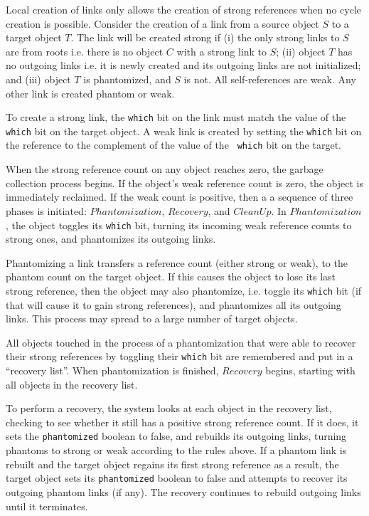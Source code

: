 Local creation of links only allows the creation of strong references when no
cycle creation is possible. Consider the creation of a link from a source object $S$
to a target object $T$. The link will be created strong if (i) the only strong
links to $S$ are from roots i.e. there is no object $C$ with a strong link to $S$;
(ii) object $T$ has no outgoing links i.e. it is newly created and its outgoing links are
not initialized; and (iii) object $T$ is phantomized, and $S$ is not. All
self-references are weak. Any other link is created phantom or weak.

To create a strong link, the {\tt which} bit on the link must match the value of
the {\tt which} bit on the target object. A weak link is created by setting the
{\tt which} bit on the reference to the complement of the value of the {\tt
which} bit on the target.

When the strong reference count on any object reaches zero, the garbage
collection process begins.
If the object's weak reference count is zero, the
object is immediately reclaimed. If the weak count is positive, then a
a sequence of three phases is initiated: $Phantomization$, $Recovery$, and $CleanUp$.
In $Phantomization$, the object toggles its {\tt which} bit, turning its
incoming weak reference counts to strong ones,
and phantomizes its outgoing links.

Phantomizing a link transfers a reference count (either strong or weak), to the
phantom count on the target object. If this causes the object to lose its
last strong reference, then the object may also phantomize, i.e. toggle its {\tt which} bit (if that
will cause it to gain strong references), %
and phantomizes all its outgoing
links. This process may spread to a large number of target objects.

All objects touched in the process of a phantomization that were able to recover
their strong references by toggling their {\tt which} bit are remembered and put
in a ``recovery list''.
When phantomization is finished, $Recovery$ begins, starting with all objects in the recovery list.

To perform a recovery, the system looks at each object in the recovery list,
checking to see whether it still has a positive strong reference count. If it
does, it sets the {\tt phantomized} boolean to false, and rebuilds its outgoing
links, turning phantoms to strong or weak according to the rules above. If a
phantom link is rebuilt and the target object regains its first strong reference
as a result, the target object sets its {\tt phantomized} boolean to false and
attempts to recover its outgoing phantom links (if any). The recovery continues
to rebuild outgoing links until it terminates. %

